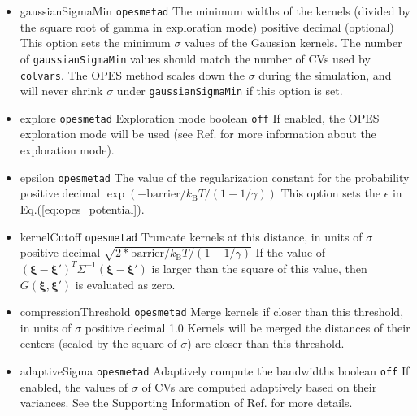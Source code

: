 \begin{itemize}
\item %
  \key
    {gaussianSigmaMin}{%
    \texttt{opes{\textunderscore}metad}}{%
    The minimum widths of the kernels (divided by the square root of gamma in exploration mode)}{%
    positive decimal (optional)}{%
    This option sets the minimum $\sigma$ values of the Gaussian kernels. The number of \texttt{gaussianSigmaMin} values should match the number of CVs used by \texttt{colvars}. The OPES method scales down the $\sigma$ during the simulation, and will never shrink $\sigma$ under \texttt{gaussianSigmaMin} if this option is set.}
\item %
  \keydef
    {explore}{%
    \texttt{opes{\textunderscore}metad}}{%
    Exploration mode}{%
    boolean}{%
    \texttt{off}}{%
    If enabled, the OPES exploration mode will be used (see Ref.\cite{Invernizzi2022} for more information about the exploration mode).}
\item %
  \keydef
    {epsilon}{%
    \texttt{opes{\textunderscore}metad}}{%
    The value of the regularization constant for the probability}{%
    positive decimal}{%
    $\exp(-\mathrm{barrier} / k_{\mathrm{B}} T / (1-1/\gamma))$}{%
    This option sets the $\epsilon$ in Eq.(\ref{eq:opes_potential}).}
\item %
  \keydef
    {kernelCutoff}{%
    \texttt{opes{\textunderscore}metad}}{%
    Truncate kernels at this distance, in units of $\sigma$}{%
    positive decimal}{%
    $\sqrt{2*\mathrm{barrier}/k_{\mathrm{B}} T/(1-1/\gamma)}$}{%
    If the value of $(\boldsymbol{\xi}-\boldsymbol{\xi}')^T \Sigma^{-1}(\boldsymbol{\xi}-\boldsymbol{\xi}')$ is larger than the square of this value, then $G(\boldsymbol{\xi}, \boldsymbol{\xi}')$ is evaluated as zero.}
\item %
  \keydef
    {compressionThreshold}{%
    \texttt{opes{\textunderscore}metad}}{%
    Merge kernels if closer than this threshold, in units of $\sigma$}{%
    positive decimal}{%
    1.0}{%
    Kernels will be merged the distances of their centers (scaled by the square of $\sigma$) are closer than this threshold.}
\item %
  \keydef
    {adaptiveSigma}{%
    \texttt{opes{\textunderscore}metad}}{%
    Adaptively compute the bandwidths}{%
    boolean}{%
    \texttt{off}}{%
    If enabled, the values of $\sigma$ of CVs are computed adaptively based on their variances. See the Supporting Information of Ref.\cite{Invernizzi2022} for more details.}

\end{itemize}
